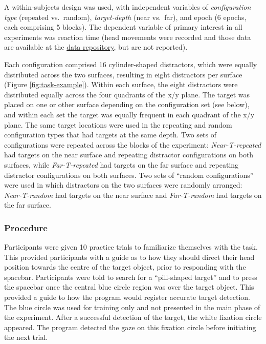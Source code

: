 \documentclass[
  english,
  man,floatsintext]{apa7}
\begin{document}
A within-subjects design was used, with independent variables of \emph{configuration type} (repeated vs.~random), \emph{target-depth} (near vs.~far), and epoch (6 epochs, each comprising 5 blocks). The dependent variable of primary interest in all experiments was reaction time (head movements were recorded and those data are available at the \href{https://github.com/tombeesley/CCVR}{data repository}, but are not reported).

Each configuration comprised 16 cylinder-shaped distractors, which were equally distributed across the two surfaces, resulting in eight distractors per surface (Figure \ref{fig:task-example}). Within each surface, the eight distractors were distributed equally across the four quadrants of the x/y plane. The target was placed on one or other surface depending on the configuration set (see below), and within each set the target was equally frequent in each quadrant of the x/y plane. The same target locations were used in the repeating and random configuration types that had targets at the same depth. Two sets of configurations were repeated across the blocks of the experiment: \emph{Near-T-repeated} had targets on the near surface and repeating distractor configurations on both surfaces, while \emph{Far-T-repeated} had targets on the far surface and repeating distractor configurations on both surfaces. Two sets of ``random configurations'' were used in which distractors on the two surfaces were randomly arranged: \emph{Near-T-random} had targets on the near surface and \emph{Far-T-random} had targets on the far surface.

\hypertarget{procedure}{%
\subsubsection{Procedure}\label{procedure}}

Participants were given 10 practice trials to familiarize themselves with the task. This provided participants with a guide as to how they should direct their head position towards the centre of the target object, prior to responding with the spacebar. Participants were told to search for a ``pill-shaped target'' and to press the spacebar once the central blue circle region was over the target object. This provided a guide to how the program would register accurate target detection. The blue circle was used for training only and not presented in the main phase of the experiment. After a successful detection of the target, the white fixation circle appeared. The program detected the gaze on this fixation circle before initiating the next trial.
\end{document}
